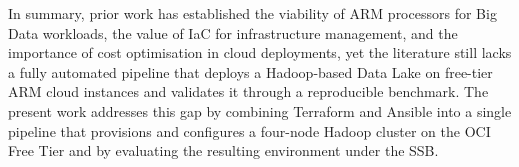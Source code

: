 In summary, prior work has established the viability of ARM processors for Big Data
workloads, the value of IaC for infrastructure management, and the importance of cost
optimisation in cloud deployments, yet the literature still lacks a fully automated pipeline that deploys a Hadoop-based Data
Lake on free-tier ARM cloud instances and validates it through a reproducible benchmark. The
present work addresses this gap by combining Terraform and Ansible into a single
pipeline that provisions and configures a four-node Hadoop cluster on the OCI Free
Tier and by evaluating the resulting environment under the SSB.
